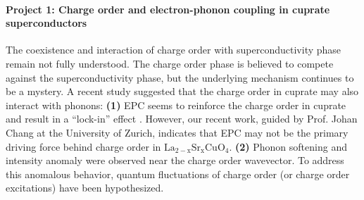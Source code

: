 \documentclass[11pt]{article}
\begin{document}
\paragraph{Project 1: Charge order and electron-phonon coupling in cuprate superconductors}
The coexistence and interaction of charge order with superconductivity phase remain not fully understood. 
The charge order phase is believed to compete against the superconductivity phase\cite{arpaia_charge_2021,comin_resonant_2016,canosa_resonant_2014, hucker_competing_2014, chang_direct_2012,ghiringhelli_long-range_2012}, but the underlying mechanism continues to be a mystery. 
A recent study suggested that the charge order in cuprate may also interact with phonons: \textbf{(1)} EPC seems to reinforce the charge order in cuprate and result in a ``lock-in'' effect \cite{wang_charge_2021}. However, our recent work, guided by Prof. Johan Chang at the University of Zurich, indicates that EPC may not be the primary driving force behind charge order in $\mathrm{La_{2-x}Sr_xCuO_4}$. \textbf{(2)} Phonon softening and intensity anomaly were observed near the charge order wavevector\cite{wang_charge_2021,lee_spectroscopic_2021, huang_quantum_2021,lin_strongly_2020,li_multiorbital_2020,braicovich_determining_2020,peng_enhanced_2020, miao_incommensurate_2018,chaix_dispersive_2017,tacon_inelastic_2014}. 
To address this anomalous behavior, quantum fluctuations of charge order (or charge order excitations) have been hypothesized\cite{huang_quantum_2021,lee_spectroscopic_2021}.  
\end{document}
